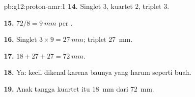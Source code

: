 \begin{solution}{pb:g12:proton-nmr:1}
\textbf{14.} Singlet 3, kuartet 2, triplet 3.

\textbf{15.} $72 / 8 = \qty{9}{mm}$ per .

\textbf{16.} Singlet $3 \times 9 = \qty{27}{mm}$; triplet
\qty{27}{mm}.

\textbf{17.} $18 + 27 + 27 = \qty{72}{mm}$.

\textbf{18.} Ya:  kecil dikenal karena baunya yang harum
seperti buah.

\textbf{19.} Anak tangga kuartet itu \qty{18}{mm} dari \qty{72}{mm}.
\end{solution}
